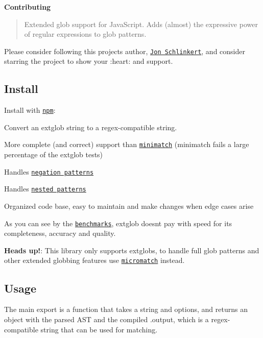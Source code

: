 {\bfseries Contributing}

\begin{quote}
Extended glob support for Java\+Script. Adds (almost) the expressive power of regular expressions to glob patterns. \end{quote}


Please consider following this project\textquotesingle{}s author, \href{https://github.com/jonschlinkert}{\tt Jon Schlinkert}, and consider starring the project to show your \+:heart\+: and support.

\subsection*{Install}

Install with \href{https://www.npmjs.com/}{\tt npm}\+:





\begin{DoxyItemize}
\item Convert an extglob string to a regex-\/compatible string.
\item More complete (and correct) support than \href{https://github.com/isaacs/minimatch}{\tt minimatch} (minimatch fails a large percentage of the extglob tests)
\item Handles \href{#extglob-patterns}{\tt negation patterns}
\item Handles \href{#extglob-patterns}{\tt nested patterns}
\item Organized code base, easy to maintain and make changes when edge cases arise
\item As you can see by the \href{#benchmarks}{\tt benchmarks}, extglob doesn\textquotesingle{}t pay with speed for it\textquotesingle{}s completeness, accuracy and quality.
\end{DoxyItemize}

{\bfseries Heads up!}\+: This library only supports extglobs, to handle full glob patterns and other extended globbing features use \href{https://github.com/jonschlinkert/micromatch}{\tt micromatch} instead.

\subsection*{Usage}

The main export is a function that takes a string and options, and returns an object with the parsed A\+ST and the compiled {\ttfamily .output}, which is a regex-\/compatible string that can be used for matching.


